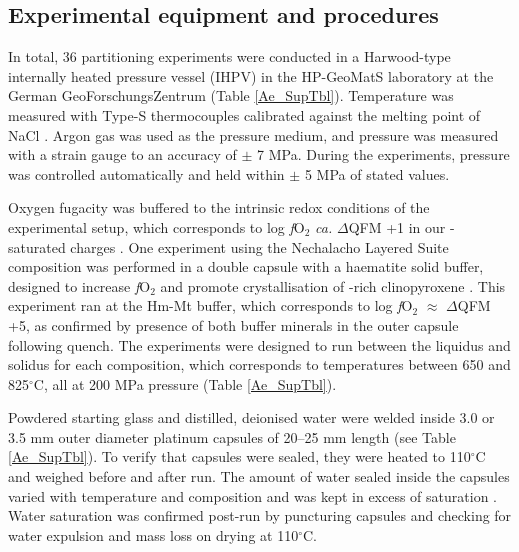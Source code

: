 \documentclass[review,authoryear,12pt]{elsarticle}
\newcommand{\dgC}{$^\circ$C }
\newcommand{\dgCs}{$^\circ$C}
\newcommand{\fO}{\textit{f}O$_{2}$ }
\begin{document}
\subsection{Experimental equipment and procedures}

        In total, 36 partitioning experiments were conducted in a Harwood-type internally heated pressure vessel (IHPV) in the HP-GeoMatS laboratory at the German GeoForschungsZentrum (Table \ref{Ae_SupTbl}). Temperature was measured with Type-S thermocouples calibrated against the melting point of NaCl \citep[][accuracy of $\pm$ 5 \dgC at 200 MPa]{Borchert2010}. Argon gas was used as the pressure medium, and pressure was measured with a strain gauge to an accuracy of $\pm$ 7 MPa. During the experiments, pressure was controlled automatically and held within $\pm$ 5 MPa of stated values. 

Oxygen fugacity was buffered to the intrinsic redox conditions of the experimental setup, which corresponds to log \fO \emph{ca.} $\Delta$QFM +1 in our -saturated charges \cite[see][]{Chou1986,Berndt2002, Jugo2010}. One experiment using the Nechalacho Layered Suite composition was performed in a double capsule with a haematite solid buffer, designed to increase \fO and promote crystallisation of -rich clinopyroxene \citep{Eugster1962}. This experiment ran at the Hm-Mt buffer, which corresponds to log \fO $\approx$ $\Delta$QFM +5, as confirmed by presence of both buffer minerals in the outer capsule following quench. The experiments were designed to run between the liquidus and solidus for each composition, which corresponds to temperatures between 650 and 825\dgCs, all at 200 MPa pressure (Table \ref{Ae_SupTbl}).

Powdered starting glass and distilled, deionised water were welded inside 3.0 or 3.5 mm outer diameter platinum capsules of 20--25 mm length (see Table \ref{Ae_SupTbl}). To verify that capsules were sealed, they were heated to 110\dgC and weighed before and after run. The amount of water sealed inside the capsules varied with temperature and composition and was kept in excess of saturation \citep{Carroll1997, Moore1998, Schmidt2008}. Water saturation was confirmed post-run by puncturing capsules and checking for water expulsion and mass loss on drying at 110\dgCs.
\end{document}
